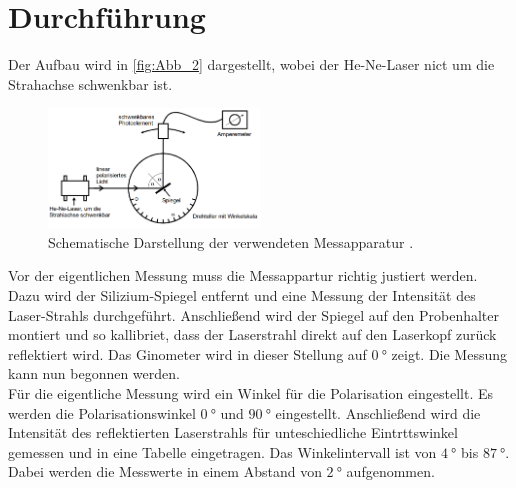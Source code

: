 \section{Durchführung}
\label{sec:Durchführung}
Der Aufbau wird in \autoref{fig:Abb_2} dargestellt, wobei der He-Ne-Laser nict um die Strahachse schwenkbar ist.
\begin{figure}[H]
    \centering
    \includegraphics[width=0.5\textwidth]{Abbildung/Abb_2.png}
    \caption {Schematische Darstellung der verwendeten Messapparatur \cite{V407}.}
    \label{fig:Abb_2}
\end{figure}
Vor der eigentlichen Messung muss die Messappartur richtig justiert werden. Dazu wird der 
Silizium-Spiegel entfernt und eine Messung der Intensität des Laser-Strahls durchgeführt.
Anschließend wird der Spiegel auf den Probenhalter montiert und so kallibriet, dass der Laserstrahl
direkt auf den Laserkopf zurück reflektiert wird. Das Ginometer wird in dieser 
Stellung auf $\qty{0}{\degree}$ zeigt. Die Messung kann nun begonnen werden.\\
Für die eigentliche Messung wird ein Winkel für die Polarisation eingestellt.
Es werden die Polarisationswinkel $\qty{0}{\degree}$ und $\qty{90}{\degree}$  eingestellt.
Anschließend wird die Intensität des reflektierten Laserstrahls für unteschiedliche Eintrttswinkel gemessen und 
in eine Tabelle eingetragen. Das Winkelintervall ist von $\qty{4}{\degree}$ bis $\qty{87}{\degree}$.
Dabei werden die Messwerte in einem Abstand von $\qty{2}{\degree}$ aufgenommen.